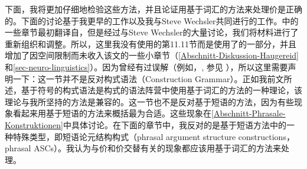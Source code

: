     下面，我将更加仔细地检验这些方法，并且论证用基于词汇的方法来处理价是正确的。下面的讨论基于我更早的工作\citep{Mueller2006d,Mueller2007d,MuellerPersian}以及我与Steve Wechsler共同进行的工作\citep{MWArgSt,MWArgStReply}。\citet{MWArgSt}中的一些章节最初翻译自\citet{MuellerGTBuch2}，但是经过与Steve Wechsler的大量讨论，我们将材料进行了重新组织和调整。所以，这里我没有使用的第11.11节而是使用了的一部分，并且增加了因空间限制而未收入该文的一些小章节（\ref{Abschnitt-Diskussion-Haugereid}和\ref{sec-neuro-linguistics}）。因为曾经有过误解（例如，, 参见 ），所以这里需要声明一下：这一节并不是反对构式语法\indexcxgc（Construction Grammar）。正如我前文所述，基于符号的构式语法是构式的语法阵营中使用基于词汇的方法的一种理论，该理论与我所坚持的方法是兼容的。这一节也不是反对基于短语的方法，因为有些现象看起来用基于短语的方法来概括最为合适。这些现象在\ref{Abschnitt-Phrasale-Konstruktionen}中具体讨论。在下面的章节中，我反对的是基于短语方法中的一种特殊类型，即短语论元结构构式（phrasal argument structure constructions，phrasal ASCs）。我认为与价和价交替有关的现象都应该用基于词汇的方法来处理。

